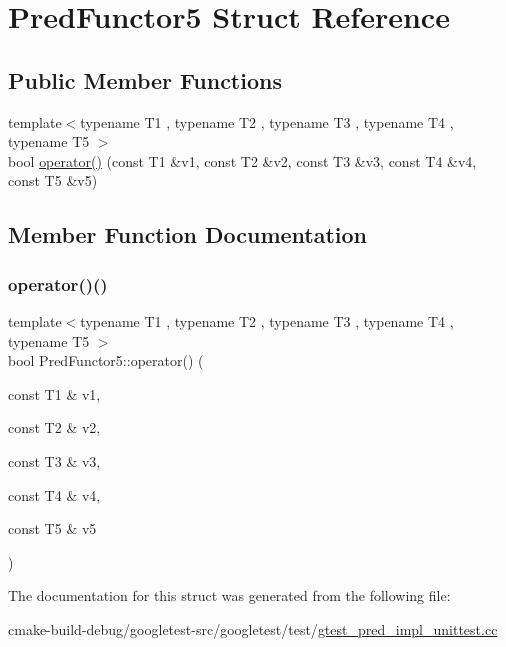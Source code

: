 \hypertarget{structPredFunctor5}{}\section{Pred\+Functor5 Struct Reference}
\label{structPredFunctor5}
\subsection*{Public Member Functions}
\begin{DoxyCompactItemize}
\item 
{\footnotesize template$<$typename T1 , typename T2 , typename T3 , typename T4 , typename T5 $>$ }\\bool \mbox{\hyperlink{structPredFunctor5_af9decf4d509848479ccdc4fe90129a06}{operator()}} (const T1 \&v1, const T2 \&v2, const T3 \&v3, const T4 \&v4, const T5 \&v5)
\end{DoxyCompactItemize}


\subsection{Member Function Documentation}
\mbox{\label{structPredFunctor5_af9decf4d509848479ccdc4fe90129a06}} 
\subsubsection{\texorpdfstring{operator()()}{operator()()}}
{\footnotesize\ttfamily template$<$typename T1 , typename T2 , typename T3 , typename T4 , typename T5 $>$ \\
bool Pred\+Functor5\+::operator() (\begin{DoxyParamCaption}\item[{const T1 \&}]{v1,  }\item[{const T2 \&}]{v2,  }\item[{const T3 \&}]{v3,  }\item[{const T4 \&}]{v4,  }\item[{const T5 \&}]{v5 }\end{DoxyParamCaption})\hspace{0.3cm}{\ttfamily [inline]}}



The documentation for this struct was generated from the following file\+:\begin{DoxyCompactItemize}
\item 
cmake-\/build-\/debug/googletest-\/src/googletest/test/\mbox{\hyperlink{gtest__pred__impl__unittest_8cc}{gtest\+\_\+pred\+\_\+impl\+\_\+unittest.\+cc}}\end{DoxyCompactItemize}
